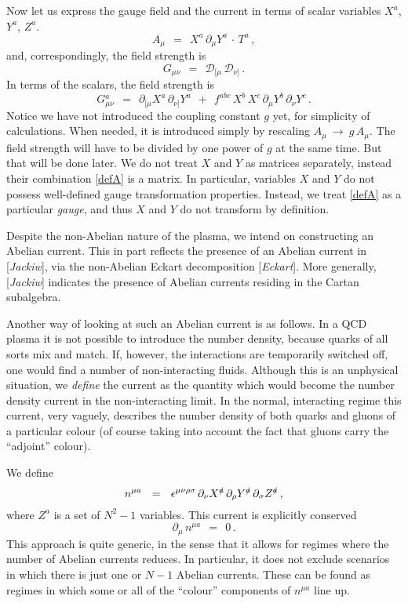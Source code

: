 \documentclass[epsfig,12pt]{article}
\def\beq{\begin{equation}}
\def\eeq{\end{equation}}
\newcommand{\p}{\partial}
\newcommand{\md}{\mathcal{D}}
\begin{document}
	Now let us express the gauge field and the current in terms of scalar variables $ X^a $, $ Y^a $, $ Z^a $.
\beq
\label{defA}
        A_\mu    ~~=~~    X^a\, \p_\mu Y^a\, \cdot\, T^a\,,
\eeq
	and, correspondingly, the field strength is
\beq
\label{defG}
	G_{\mu\nu}    ~~=~~    \md_{[\mu}\, \md_{\nu]}\,.
\eeq
	In terms of the scalars, the field strength is
\beq
\label{Ga}
	G{}_{\mu\nu}^a    ~~=~~    \p_{[\mu} X^a\, \p_{\nu]} Y^a  ~~+~~
				   f^{abc}\, X^b\, X^c\, \p_\mu Y^b\, \p_\nu Y^c\,.
\eeq
        Notice we have not introduced the coupling constant $ g $ yet, for simplicity of calculations.
	When needed, it is introduced simply by rescaling $ A_\mu ~\to~ g\, A_\mu $.
	The field strength will have to be divided by one power of $ g $ at the same time.
	But that will be done later.
        We do not treat $ X $ and $ Y $ as matrices separately, instead their combination \eqref{defA} is a matrix.
	In particular, variables $ X $ and $ Y $ do not possess well-defined gauge transformation properties.
	Instead, we treat \eqref{defA} as a particular \emph{gauge}, and thus
	$ X $ and $ Y $ do not transform by definition.

	Despite the non-Abelian nature of the plasma, we intend on constructing an Abelian current.
        This in part reflects the presence of an Abelian current in [{\it Jackiw}], via the non-Abelian Eckart decomposition [{\it Eckart}].
	More generally, [{\it Jackiw}] indicates the presence of Abelian currents residing in the Cartan subalgebra.

	Another way of looking at such an Abelian current is as follows.
	In a QCD plasma it is not possible to introduce the number density, because quarks of all sorts
	mix and match.
	If, however, the interactions are temporarily switched off, one would find a number of non-interacting fluids.
	Although this is an unphysical situation, we \emph{define} the current as the quantity which would
        become the number density current in the non-interacting limit.
	In the normal, interacting regime this current, very vaguely, describes the number density
	of both quarks and gluons of a particular colour
	(of course taking into account the fact that gluons carry the ``adjoint'' colour).

	We define
\beq
\label{defna}
	n^{\mu a}    ~~=~~    \epsilon^{\mu\nu\rho\sigma}\, \p_\nu X^\slashed{a}\, \p_\rho Y^\slashed{a}\, \p_\sigma Z^\slashed{a}\,,
\eeq
	where $ Z^a $ is a set of $ N^2 - 1 $ variables.
	This current is explicitly conserved
\beq
\label{ncont}
	\p_\mu\, n^{\mu a}    ~~=~~    0\,.
\eeq
	This approach is quite generic, in the sense that it allows for regimes where the number of Abelian
	currents reduces.
	In particular, it does not exclude scenarios in which there is just one or $ N - 1 $ Abelian currents.
	These can be found as regimes in which some or all of the ``colour'' components of $ n^{\mu a} $ line up.
\end{document}
